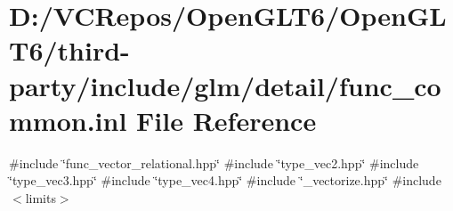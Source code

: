 \hypertarget{func__common_8inl}{}\section{D\+:/\+V\+C\+Repos/\+Open\+G\+L\+T6/\+Open\+G\+L\+T6/third-\/party/include/glm/detail/func\+\_\+common.inl File Reference}
\label{func__common_8inl}
{\ttfamily \#include \char`\"{}func\+\_\+vector\+\_\+relational.\+hpp\char`\"{}}\newline
{\ttfamily \#include \char`\"{}type\+\_\+vec2.\+hpp\char`\"{}}\newline
{\ttfamily \#include \char`\"{}type\+\_\+vec3.\+hpp\char`\"{}}\newline
{\ttfamily \#include \char`\"{}type\+\_\+vec4.\+hpp\char`\"{}}\newline
{\ttfamily \#include \char`\"{}\+\_\+vectorize.\+hpp\char`\"{}}\newline
{\ttfamily \#include $<$limits$>$}\newline
